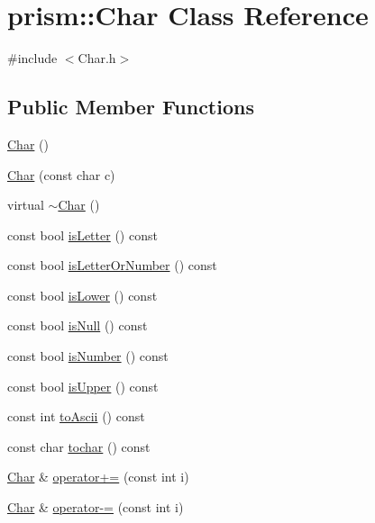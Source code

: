 \hypertarget{classprism_1_1_char}{}\section{prism\+:\+:Char Class Reference}
\label{classprism_1_1_char}


{\ttfamily \#include $<$Char.\+h$>$}

\subsection*{Public Member Functions}
\begin{DoxyCompactItemize}
\item 
\hyperlink{classprism_1_1_char_ae5e69d2f43f9c357cd2abcbf96c835cb}{Char} ()
\item 
\hyperlink{classprism_1_1_char_ad3d23a1b70477b29e1ffdfe8c0c6ac73}{Char} (const char c)
\item 
virtual \hyperlink{classprism_1_1_char_a380f6e37b5bf3ccd5a370ba5fd1b49df}{$\sim$\+Char} ()
\item 
const bool \hyperlink{classprism_1_1_char_a588ec1d5a5f8533ff6ec7664b93978dc}{is\+Letter} () const 
\item 
const bool \hyperlink{classprism_1_1_char_adfd1a3e0892573b4f7259e1985807fb7}{is\+Letter\+Or\+Number} () const 
\item 
const bool \hyperlink{classprism_1_1_char_af79d4d532aff44db259852b28fdb8890}{is\+Lower} () const 
\item 
const bool \hyperlink{classprism_1_1_char_a9869d8f45403bf30072bfd6d8b7374f1}{is\+Null} () const 
\item 
const bool \hyperlink{classprism_1_1_char_aae5ca384e263d56a9c0dfcc22707e24a}{is\+Number} () const 
\item 
const bool \hyperlink{classprism_1_1_char_a6f51555989b72ca424a515a5fb6471a9}{is\+Upper} () const 
\item 
const int \hyperlink{classprism_1_1_char_a26d719979d33ddc420591eb92fbf3bfc}{to\+Ascii} () const 
\item 
const char \hyperlink{classprism_1_1_char_aefd335b68105adc4a7904b5f6bdd6d3e}{tochar} () const 
\item 
\hyperlink{classprism_1_1_char}{Char} \& \hyperlink{classprism_1_1_char_ac55fb85b00dfabeaf52171c9cb6f09cf}{operator+=} (const int i)
\item 
\hyperlink{classprism_1_1_char}{Char} \& \hyperlink{classprism_1_1_char_a3366825c859912a25832f244eeeceb46}{operator-\/=} (const int i)
\end{DoxyCompactItemize}
